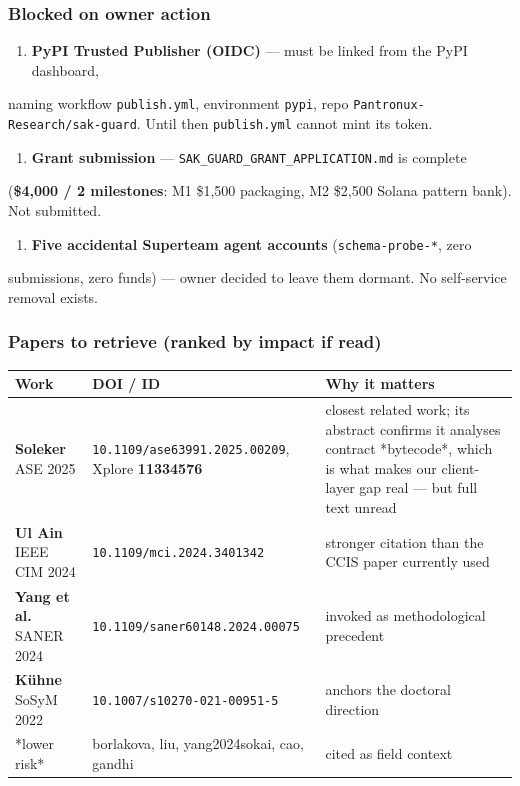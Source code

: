 \documentclass[10pt,a4paper]{article}
\begin{document}
\subsubsection*{Blocked on owner action}

\begin{enumerate}
\item \textbf{PyPI Trusted Publisher (OIDC)} --- must be linked from the PyPI dashboard,
\end{enumerate}
   naming workflow \texttt{publish.yml}, environment \texttt{pypi}, repo
   \texttt{Pantronux-Research/sak-guard}. Until then \texttt{publish.yml} cannot mint its token.
\begin{enumerate}
\item \textbf{Grant submission} --- \texttt{SAK\_GUARD\_GRANT\_APPLICATION.md} is complete
\end{enumerate}
   (\textbf{\$4,000 / 2 milestones}: M1 \$1,500 packaging, M2 \$2,500 Solana pattern bank).
   Not submitted.
\begin{enumerate}
\item \textbf{Five accidental Superteam agent accounts} (\texttt{schema-probe-*}, zero
\end{enumerate}
   submissions, zero funds) --- owner decided to leave them dormant. No self-service
   removal exists.

\subsubsection*{Papers to retrieve (ranked by impact if read)}

\begin{longtable}{@{}p{} p{} p{} @{}}\toprule
Work & DOI / ID & Why it matters \\
\midrule
\textbf{Soleker} ASE 2025 & \texttt{10.1109/ase63991.2025.00209}, Xplore \textbf{11334576} & closest related work; its abstract confirms it analyses contract *bytecode*, which is what makes our client-layer gap real --- but full text unread \\
\textbf{Ul Ain} IEEE CIM 2024 & \texttt{10.1109/mci.2024.3401342} & stronger citation than the CCIS paper currently used \\
\textbf{Yang et al.} SANER 2024 & \texttt{10.1109/saner60148.2024.00075} & invoked as methodological precedent \\
\textbf{Kühne} SoSyM 2022 & \texttt{10.1007/s10270-021-00951-5} & anchors the doctoral direction \\
*lower risk* & borlakova, liu, yang2024sokai, cao, gandhi & cited as field context \\
\bottomrule\end{longtable}
\end{document}
